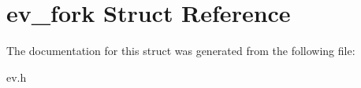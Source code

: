 \hypertarget{structev__fork}{}\section{ev\+\_\+fork Struct Reference}
\label{structev__fork}


The documentation for this struct was generated from the following file\+:\begin{DoxyCompactItemize}
\item 
ev.\+h\end{DoxyCompactItemize}
